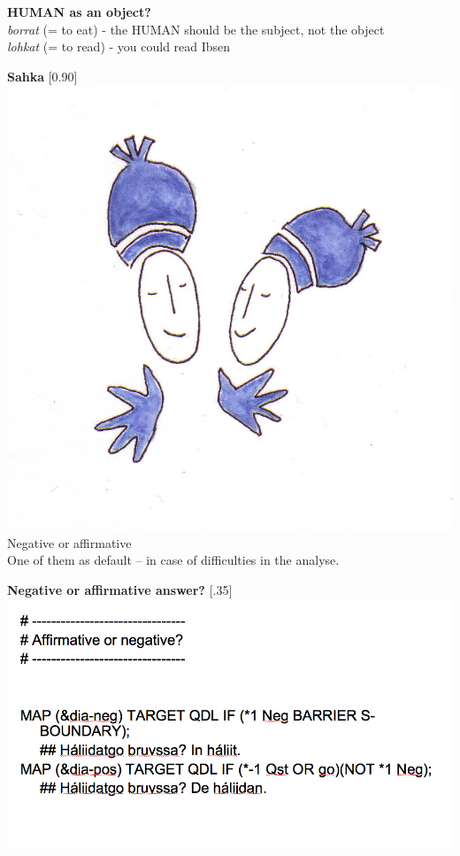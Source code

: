 \documentclass[landscape,norsk,11pt]{seminar}
\begin{document}
\begin{slide}
\newslide
\textbf{HUMAN as an object?} \\
 \textit{borrat} (= to eat) - the HUMAN should be the subject, not the object \\
  \textit{lohkat} (= to read) - you could read Ibsen

\newslide
\textbf{Sahka}
\scalebox{0.90}[0.90]{\includegraphics{img/sahka.png}} \\

\newslide
Negative or affirmative \\
One of them as default -- in case of difficulties in the analyse.

\newslide
\textbf{Negative or affirmative answer?}
\scalebox{.35}[.35]{\includegraphics{img/aff_or_neg.png}}




\end{slide}
\end{document}
